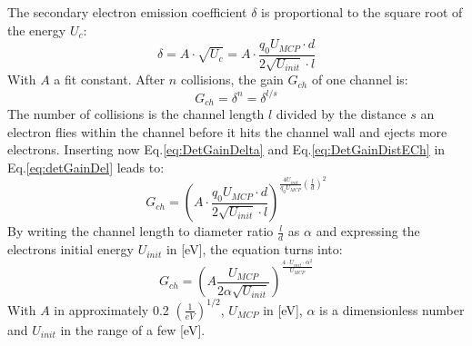 		The secondary electron emission coefficient $\delta$ is proportional to the square root of the energy $U_c$:
		\begin{equation}
			\delta = A\cdot \sqrt{U_c} = A\cdot \frac{q_0 U_{MCP}\cdot d}{2 \sqrt{U_{init}}\cdot l}
			\label{eq:DetGainDelta}
		\end{equation}
		With $A$ a fit constant. After $n$ collisions, the gain $G_{ch}$ of one channel is:
		\begin{equation}
			G_{ch} = \delta^{n} = \delta^{l/s}
			\label{eq:detGainDel}
		\end{equation}
		The number of collisions is the channel length $l$ divided by the distance $s$ an electron flies within the channel before it hits the channel wall and ejects more electrons. Inserting now Eq.\eqref{eq:DetGainDelta} and Eq.\eqref{eq:DetGainDistECh} in Eq.\eqref{eq:detGainDel} leads to:
		\begin{equation}
			G_{ch} = \left(A\cdot\frac{q_0 U_{MCP} \cdot d}{2\sqrt{U_{init}}\cdot l}\right)^{\frac{4U_{init}}{q_0 U_{MCP}}\left(\frac{l}{d}\right)^2}
		\end{equation}
		By writing the channel length to diameter ratio $\frac{l}{d}$ as $\alpha$ and expressing the electrons initial energy $U_{init}$ in [eV], the equation turns into:
		\begin{equation}
			G_{ch} = \left(A\frac{U_{MCP}}{2\alpha\sqrt{U_{init}}}\right)^{\frac{4\cdot U_{init}\cdot\alpha^2}{U_{MCP}}}
		\end{equation}
		With $A$ in approximately 0.2 $\left(\frac{1}{eV}\right)^{1/2}$, %
		$U_{MCP}$ in [eV], $\alpha$ is a dimensionless number and $U_{init}$ in the range of a few [eV].

		
		
		
